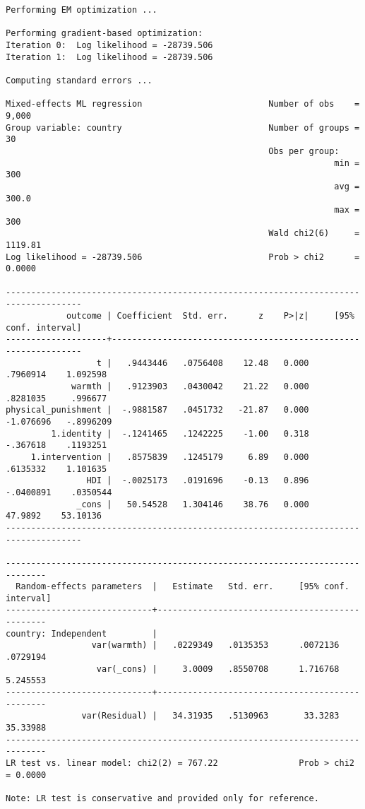 \documentclass[
  letterpaper,
  DIV=11,
  numbers=noendperiod]{scrreprt}
\begin{document}
\begin{verbatim}
Performing EM optimization ...

Performing gradient-based optimization: 
Iteration 0:  Log likelihood = -28739.506  
Iteration 1:  Log likelihood = -28739.506  

Computing standard errors ...

Mixed-effects ML regression                         Number of obs    =   9,000
Group variable: country                             Number of groups =      30
                                                    Obs per group:
                                                                 min =     300
                                                                 avg =   300.0
                                                                 max =     300
                                                    Wald chi2(6)     = 1119.81
Log likelihood = -28739.506                         Prob > chi2      =  0.0000

-------------------------------------------------------------------------------------
            outcome | Coefficient  Std. err.      z    P>|z|     [95% conf. interval]
--------------------+----------------------------------------------------------------
                  t |   .9443446   .0756408    12.48   0.000     .7960914    1.092598
             warmth |   .9123903   .0430042    21.22   0.000     .8281035     .996677
physical_punishment |  -.9881587   .0451732   -21.87   0.000    -1.076696   -.8996209
         1.identity |  -.1241465   .1242225    -1.00   0.318     -.367618    .1193251
     1.intervention |   .8575839   .1245179     6.89   0.000     .6135332    1.101635
                HDI |  -.0025173   .0191696    -0.13   0.896    -.0400891    .0350544
              _cons |   50.54528   1.304146    38.76   0.000      47.9892    53.10136
-------------------------------------------------------------------------------------

------------------------------------------------------------------------------
  Random-effects parameters  |   Estimate   Std. err.     [95% conf. interval]
-----------------------------+------------------------------------------------
country: Independent         |
                 var(warmth) |   .0229349   .0135353      .0072136    .0729194
                  var(_cons) |     3.0009   .8550708      1.716768    5.245553
-----------------------------+------------------------------------------------
               var(Residual) |   34.31935   .5130963       33.3283    35.33988
------------------------------------------------------------------------------
LR test vs. linear model: chi2(2) = 767.22                Prob > chi2 = 0.0000

Note: LR test is conservative and provided only for reference.
\end{verbatim}
\end{document}
